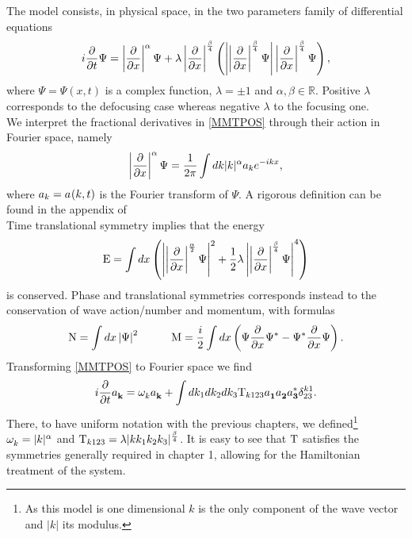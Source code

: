     The model consists, in physical space, in the two parameters family of differential equations
    \begin{equation}
        i\frac{\partial}{\partial t} \Psi = \left|\frac{\partial}{\partial x}\right|^\alpha \Psi + \lambda \left|\frac{\partial}{\partial x}\right|^{\frac{\beta}{4}}
        \left( \left|\left|\frac{\partial}{\partial x}\right|^{\frac{\beta}{4}}\Psi\right|\left|\frac{\partial}{\partial x}\right|^{\frac{\beta}{4}}\Psi \right),
        \label{MMTPOS}
    \end{equation}
    where $\Psi = \Psi(x,t)$ is a complex function, $\lambda = \pm 1$ and $\alpha, \beta \in \mathbb{R}$. Positive $\lambda$ 
    corresponds to the defocusing case whereas negative $\lambda$ to the focusing one.\\
    We interpret the fractional derivatives in \eqref{MMTPOS} through their action in Fourier space, namely 
    \begin{equation}
        \left|\frac{\partial}{\partial x}\right|^\alpha \Psi = \frac{1}{2\pi} \int dk |k|^{\alpha} a_k e^{-ikx},
    \end{equation} 
    where $a_k = a^{}(k,t)$ is the Fourier transform of $\Psi$. A rigorous definition can be found in the appendix of \cite{ZAKHAROV2004}\\
    Time translational symmetry implies that the energy
    \begin{equation}
        \mathrm{E} = \int dx \left( \left|\left|\frac{\partial}{\partial x}\right|^\frac{\alpha}{2}\Psi\right|^2 + \frac{1}{2}\lambda\left|\left|\frac{\partial}{\partial x}\right|^\frac{\beta}{4}\Psi\right|^4 \right)
    \end{equation}
    is conserved. Phase and translational symmetries corresponds instead to the conservation of wave action/number and momentum, with formulas
    \begin{equation}
        \mathrm{N} = \int dx \left| \Psi \right|^2 \hspace{1cm} \textrm{M} = \frac{i}{2}\int dx \left( \Psi \frac{\partial}{\partial x} \Psi^* - \Psi^* \frac{\partial}{\partial x} \Psi \right).
    \end{equation}
    Transforming \eqref{MMTPOS} to Fourier space we find
    \begin{equation}
        i\frac{\partial}{\partial t} a_\mathbf{k}^{} = \omega^{}_k a_\mathbf{k}^{}  + \int dk_1dk_2dk_3 \mathrm{T}_{k123}a_\mathbf{1}^{} a_\mathbf{2}^{} a_\mathbf{3}^{*} \delta^{k1}_{23}.
    \end{equation}
    There, to have uniform notation with the previous chapters, we defined\footnote{As this model is one dimensional $k$ is the only component of the wave vector and $|k|$ its modulus.} $\omega^{}_k = |k|^\alpha$ and $\mathrm{T}_{k123} = \lambda|kk_1k_2k_3|^\frac{\beta}{4}$. It is easy to see that
    $\mathrm{T}$ satisfies the symmetries generally required in chapter 1, allowing for the Hamiltonian treatment of the system. \\
